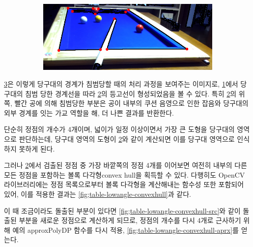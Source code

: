 \documentclass[10pt]{oblivoir}
\newcommand{\textss}[1]{\scriptsize#1\normalsize}
\begin{document}
\begin{figure}[ht]
\begin{subfigure}{8cm}
        \caption{}
        \label{fig;table-lowangle-edge}
    \end{subfigure}
    \centering
    \begin{subfigure}{8cm}
        \includegraphics[width=\textwidth]{img/billiards-table-low-angle-approx.png}
        \caption{}
        \label{fig;table-lowangle-aprx}
    \end{subfigure}
    \caption{}
    \label{fig;table-lowangle}
\end{figure}

\cref{fig;table-lowangle}은 이렇게 당구대의 경계가 침범당할 때의 처리 과정을 보여주는 이미지로, \cref{fig;table-lowangle-edge}에서 당구대의 침범 당한 경계선을 따라 \cref{fig;table-lowangle-aprx}의 등고선이 형성되었음을 볼 수 있다. 특히 \cref{fig;table-lowangle-aprx}의 위쪽, 빨간 공에 의해 침범당한 부분은 공이 내부의 쿠션 음영으로 인한 잡음와 당구대의 외부 경계를 잇는 가교 역할을 해, 더 나쁜 결과를 반환한다.

단순히 정점의 개수가 4개이며, 넓이가 일정 이상이면서 가장 큰 도형을 당구대의 영역으로 판단하는데, 당구대 영역의 도형이 \cref{fig;table-lowangle-aprx}와 같이 계산되면 이를 당구대 영역으로 인식하지 못하게 된다.

그러나 \cref{fig;table-lowangle-aprx}에서 검출된 정점 중 가장 바깥쪽의 정점 4개를 이어보면 여전히 내부의 다른 모든 정점을 포함하는 볼록 다각형\textss{convex hull}을 획득할 수 있다. 다행히도 OpenCV 라이브러리에는 정점 목록으로부터 볼록 다각형을 계산해내는 함수성 또한 포함되어 있어, 이를 적용한 결과는 \cref{fig;table-lowangle-convexhull}과 같다.

이 때 조금이라도 돌출된 부분이 있다면 \cref{fig;table-lowangle-convexhull-src}와 같이 돌출된 부분을 새로운 정점으로 계산하게 되므로, 정점의 개수를 다시 4개로 근사하기 위해 예의 approxPolyDP 함수를 다시 적용, \cref{fig;table-lowangle-convexhull-aprx}를 얻는다.
\end{document}
